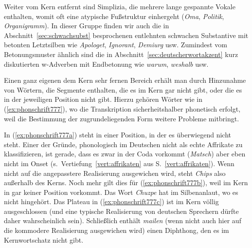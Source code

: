 Weiter vom Kern entfernt sind Simplizia, die mehrere lange gespannte Vokale enthalten, womit oft eine atypische Fußstruktur einhergeht (\textit{Oma}, \textit{Politik}, \textit{Organigramm}).
In dieser Gruppe finden wir auch die in Abschnitt~\ref{sec:schwachsubst} besprochenen entlehnten schwachen Substantive mit betonten Letztsilben wie \textit{Apologet}, \textit{Ignorant}, \textit{Demiurg} usw.
Zumindest vom Betonungsmuster ähnlich sind die in Abschnitt~\ref{sec:deutscherwortakzent} kurz diskutierten w-Adverben mit Endbetonung wie \textit{warum}, \textit{weshalb} usw.

Einen ganz eigenen dem Kern sehr fernen Bereich erhält man durch Hinzunahme von Wörtern, die Segmente enthalten, die es im Kern gar nicht gibt, oder die es in der jeweiligen Position nicht gibt.
Hierzu gehören Wörter wie in (\ref{ex:phonschrift777}), wo die Transkription sicherheitshalber phonetisch erfolgt, weil die Bestimmung der zugrundeliegenden Form weitere Probleme mitbringt.

\begin{exe}
  \ex\label{ex:phonschrift777}
  \begin{xlist}
  \end{xlist}
\end{exe}

In (\ref{ex:phonschrift777a}) steht \textipa{[\t{tS}]} in einer Position, in der es überwiegend nicht steht.
Einer der Gründe, phonologisch \textipa{[\t{tS}]} im Deutschen nicht als echte Affrikate zu klassifizieren, ist gerade, dass es zwar in der Coda vorkommt (\textit{Matsch}) aber eben nicht im Onset (s.\ Vertiefung~\ref{vert:affrikaten} aus S.~\ref{vert:affrikaten}).
Wenn nicht auf die angepasstere Realisierung \textipa{[SIps]} ausgewichen wird, steht \textit{Chips} also außerhalb des Kerns.
Noch mehr gilt dies für (\ref{ex:phonschrift777b}), weil \textipa{[\t{dZ}]} im Kern in gar keiner Position vorkommt.
Das Wort \textit{Chuzpe} hat \textipa{[X]} im Silbenanlaut, wo es nicht hingehört.
Das Plateau \textipa{[pt]} in (\ref{ex:phonschrift777c}) ist im Kern völlig ausgeschlossen (und eine typische Realisierung von deutschen Sprechern dürfte daher wahrscheinlich \textipa{[p@tEKanodOn]} sein).
Schließlich enthält \textit{mailen} (wenn nicht auch hier auf die kommodere Realisierung \textipa{[me:l@n]} ausgewichen wird) einen Diphthong, den es im Kernwortschatz nicht gibt.

